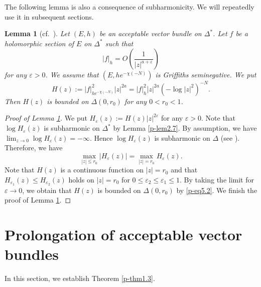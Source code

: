 \documentclass[12pt,twoside]{amsart}
\newtheorem{lem}[thm]{Lemma}
\theoremstyle{definition}
\begin{document}
The following lemma is also a consequence of 
subharmonicity. We will repeatedly use it in subsequent sections. 

\begin{lem}[{cf.~\cite[Lemma 21.2.7]{mochizuki4}}]\label{p-lem5.4}
Let $(E, h)$ be an acceptable vector bundle on 
$\Delta^*$. 
Let $f$ be a holomorphic section of $E$ on $\Delta^*$ such that 
\[
|f|_h=O\left( \frac{1}{|z|^{a+\varepsilon}}\right)
\] 
for any $\varepsilon >0$. 
We assume that $(E, he^{-\chi(-N)})$ is Griffiths seminegative. We put 
\[
H(z):=
|f|^2_{he^{-\chi(-N)}}|z|^{2a}=
|f|^2_h|z|^{2a}\left(-\log |z|^2\right)^{-N}. 
\] 
Then $H(z)$ is bounded on $\Delta(0, r_0)$ for any $0<r_0<1$. 
\end{lem}
\begin{proof}[Proof of Lemma \ref{p-lem5.4}]
We put 
$H_{\varepsilon} (z):=H(z)|z|^{2\varepsilon}$ for any $\varepsilon >0$. 
Note that $\log H_{\varepsilon}(z)$ is subharmonic on $\Delta^*$ 
by Lemma \ref{p-lem2.7}. 
By assumption, we have 
$\lim_{z\to 0} \log H_{\varepsilon}(z)=-\infty$. 
Hence $\log H_{\varepsilon}(z)$ is subharmonic on $\Delta$ 
(see \cite[(3.3.25) Theorem]{noguchi-ochiai}).
Therefore, we have 
\begin{equation}\label{p-eq5.2}
\max_{|z|\leq r_0} |H_{\varepsilon}(z)|
=\max_{|z|=r_0} H_{\varepsilon}(z). 
\end{equation} 
Note that $H(z)$ is a continuous function on $|z|=r_0$ and 
that $H_{\varepsilon _1}(z)\leq H_{\varepsilon_2}(z)$ holds on $|z|=r_0$ for 
$0\leq \varepsilon _2\leq \varepsilon _1\leq 1$. 
By taking the limit for $\varepsilon \to 0$, 
we obtain that $H(z)$ is bounded on $\Delta(0, r_0)$ by 
\eqref{p-eq5.2}. 
We finish the proof of Lemma \ref{p-lem5.4}.  
\end{proof}

\section{Prolongation of acceptable vector bundles}\label{p-sec6}

In this section, we establish Theorem \ref{p-thm1.3}. 
\end{document}
